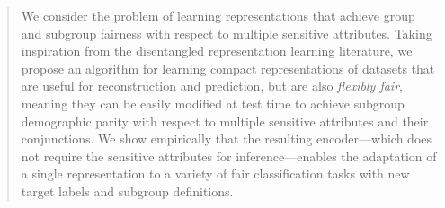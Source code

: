 \documentclass{article}
\begin{document}

\begin{abstract}
We consider the problem of learning representations that achieve group and subgroup fairness with respect to multiple sensitive attributes.
Taking inspiration from the disentangled representation learning literature, we propose an algorithm for learning compact representations of datasets that are useful for reconstruction and prediction, but are also \emph{flexibly fair}, meaning they can be easily modified at test time to achieve subgroup demographic parity with respect to multiple sensitive attributes and their conjunctions.
We show empirically that the resulting encoder---which does not require the sensitive attributes for inference---enables the adaptation of a single representation to a variety of fair classification tasks with new target labels and subgroup definitions.
\end{abstract}












\clearpage
\appendix

\end{document}
